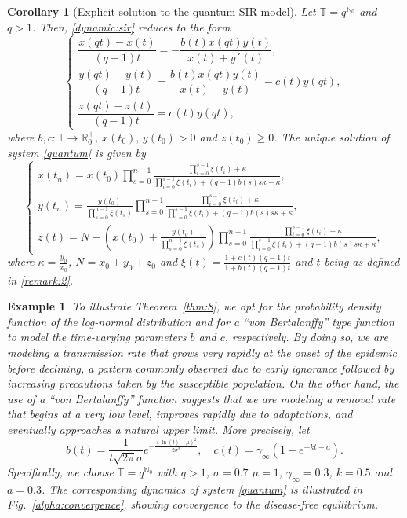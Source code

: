 \documentclass[pdflatex,sn-mathphys-num]{sn-jnl}
\newtheorem{corollary}{Corollary}
\newtheorem{example}{Example}
\theoremstyle{remark}
\begin{document}
\begin{corollary}[Explicit solution to the quantum SIR model]
\label{quantum:exact}
Let  $\mathbb{T} = q^{\mathbb{N}_0}$ and $q > 1$. Then,
\eqref{dynamic:sir} reduces to the form
\begin{equation}
\label{quantum}
\begin{cases}
\dfrac{x(qt) - x(t)}{(q-1)t} = -\dfrac{b(t)x(qt)y(t)}{x(t) + y´(t)},\\
\dfrac{y(qt) - y(t)}{(q-1)t} = \dfrac{b(t)x(qt)y(t)}{x(t) + y(t)} - c(t)y(qt),\\
\dfrac{z(qt) - z(t)}{(q-1)t} = c(t)y(qt),
\end{cases}
\end{equation}
where $b, c : \mathbb{T} \rightarrow \mathbb{R}_0^+$, $x(t_0),\, y(t_0) > 0$ 
and $z(t_0) \geq 0$.
The unique solution of system \eqref{quantum} is given by 
\begin{equation}
\label{solution:quantum}
\begin{cases}
x(t_n) = x(t_0) \displaystyle\prod_{s=0}^{n-1} 
\frac{\prod_{i=0}^{s-1} \xi(t_i) + \kappa}
{\prod_{i=0}^{s-1} \xi(t_i) + (q-1)b(s)s\kappa  + \kappa},\\
y(t_n) = \frac{y(t_0)}{\prod_{s=0}^{n-1} \xi(t_s)} 
\displaystyle\prod_{s=0}^{n-1} 
\frac{\prod_{i=0}^{s-1} \xi(t_i) + \kappa}
{\prod_{i=0}^{s-1} \xi(t_i) + (q-1)b(s)s\kappa  + \kappa},\\
z(t) = N - \left(x(t_0) + \frac{y(t_0)}{\prod_{s=0}^{n-1} \xi(t_s)}\right)
\displaystyle\prod_{s=0}^{n-1} 
\frac{\prod_{i=0}^{s-1} \xi(t_i) + \kappa}
{\prod_{i=0}^{s-1} \xi(t_i) + (q-1)b(s)s\kappa  + \kappa},
\end{cases}
\end{equation}
where $\kappa = \frac{y_0}{x_0}$, $N = x_0 + y_0 + z_0$ and 
$\xi(t) = \frac{1 + c(t)(q-1)t}{1 + b(t)(q-1)t}$ and $t$ being as defined
in \eqref{remark:2}.
\end{corollary}

\begin{example}
\label{ex:2}
To illustrate Theorem~\ref{thm:8}, we opt for the probability density function 
of the log-normal distribution and for a ``von Bertalanffy'' type function to 
model the time-varying parameters $b$ and $c$, respectively. By doing so, we 
are modeling a transmission rate that grows very rapidly at the onset of the 
epidemic before declining, a pattern commonly observed due to early ignorance 
followed by increasing precautions taken by the susceptible population. On the 
other hand, the use of a ``von Bertalanffy'' function suggests that we are
modeling a removal rate that begins at a very low level, improves rapidly due 
to adaptations, and eventually approaches a natural upper limit. More precisely,
let 
$$
b(t) = \frac{1}{t\sqrt{2\pi}\sigma} e^{-\frac{(\ln(t) - \mu)^2}{2\sigma^2}},\quad
c(t) = \gamma_\infty(1 - e^{-kt - a}).
$$
Specifically, we choose $\mathbb{T} = q^{\mathbb{N}_0}$ with $q > 1$,
$\sigma = 0.7$ $\mu = 1$, $\gamma_\infty = 0.3$,
$k = 0.5$ and $a = 0.3$. The corresponding dynamics of system \eqref{quantum} 
is illustrated in Fig.~\ref{alpha:convergence}, showing convergence
to the disease-free equilibrium.
\end{example}
\end{document}
